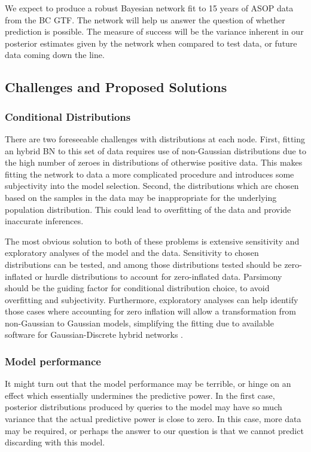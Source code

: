 \documentclass{article}
\begin{document}
We expect to produce a robust Bayesian network fit to 15 years of ASOP data from the BC GTF. The network will help us answer the question of whether prediction is possible. The measure of success will be the variance inherent in our posterior estimates given by the network when compared to test data, or future data coming down the line.

\subsection{Challenges and Proposed Solutions}

\subsubsection*{Conditional Distributions}

There are two foreseeable challenges with distributions at each node. First, fitting an hybrid BN to this set of data requires use of non-Gaussian distributions due to the high number of zeroes in distributions of otherwise positive data. This makes fitting the network to data a more complicated procedure and introduces some subjectivity into the model selection. Second, the distributions which are chosen based on the samples in the data may be inappropriate for the underlying population distribution. This could lead to overfitting of the data and provide inaccurate inferences.

The most obvious solution to both of these problems is extensive sensitivity and exploratory analyses of the model and the data. Sensitivity to chosen distributions can be tested, and among those distributions tested should be zero-inflated or hurdle distributions to account for zero-inflated data. Parsimony should be the guiding factor for conditional distribution choice, to avoid overfitting and subjectivity. Furthermore, exploratory analyses can help identify those cases where accounting for zero inflation will allow a transformation from non-Gaussian to Gaussian models, simplifying the fitting due to available software for Gaussian-Discrete hybrid networks \citep{nagarajan2013bayesian}.

\subsubsection*{Model performance}

It might turn out that the model performance may be terrible, or hinge on an effect which essentially undermines the predictive power. In the first case, posterior distributions produced by queries to the model may have so much variance that the actual predictive power is close to zero. In this case, more data may be required, or perhaps the answer to our question is that we cannot predict discarding with this model.
\end{document}
